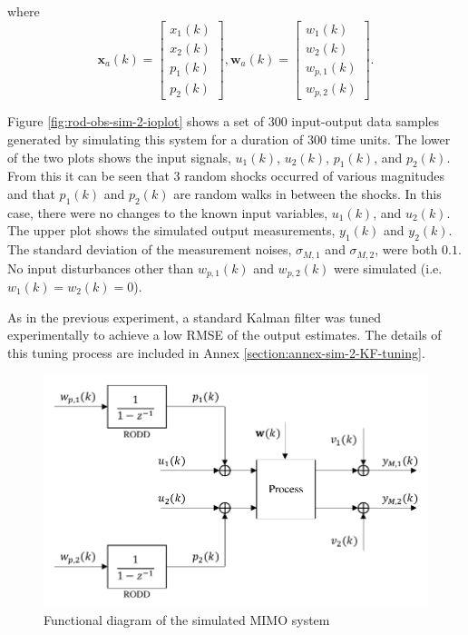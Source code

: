 where
\begin{equation} \label{eq:sim-sys-2x2-ss-aug2}
	\mathbf{x}_{a}(k) = \left[\begin{array}{l}
		x_{1}(k) \\
		x_{2}(k) \\
		p_{1}(k) \\
		p_{2}(k)
	\end{array}\right], \mathbf{w}_{a}(k) = \left[\begin{array}{l}
		w_1(k) \\
		w_2(k) \\
		w_{p,1}(k) \\
		w_{p,2}(k)
	\end{array}\right].
\end{equation}

Figure \ref{fig:rod-obs-sim-2-ioplot} shows a set of  300 input-output  data samples generated by simulating this system for a duration of 300 time units. The lower of the two plots shows the input signals, $u_1(k)$, $u_2(k)$, $p_1(k)$, and $p_2(k)$. From this it can be seen that 3 random shocks occurred of various magnitudes and that $p_1(k)$ and $p_2(k)$ are random walks in between the shocks. In this case, there were no changes to the known input variables, $u_1(k)$, and $u_2(k)$. The upper plot shows the simulated output measurements, $y_1(k)$ and $y_2(k)$. The standard deviation of the measurement noises, $\sigma_{M,1}$ and $\sigma_{M,2}$, were both $0.1$. No input disturbances other than $w_{p,1}(k)$ and $w_{p,2}(k)$ were simulated (i.e. $w_1(k)=w_2(k)=0$).

As in the previous experiment, a standard Kalman filter was tuned experimentally to achieve a low \gls{RMSE} of the output estimates.  The details of this tuning process are included in Annex \ref{section:annex-sim-2-KF-tuning}. 

\begin{figure}[htp]
	\centering
	\includegraphics[width=11.5cm]{images/sim-sys-diag-2x2.pdf}
	\caption{Functional diagram of the simulated MIMO system}
	\label{fig:sim-sys-diag-2x2}
\end{figure}

